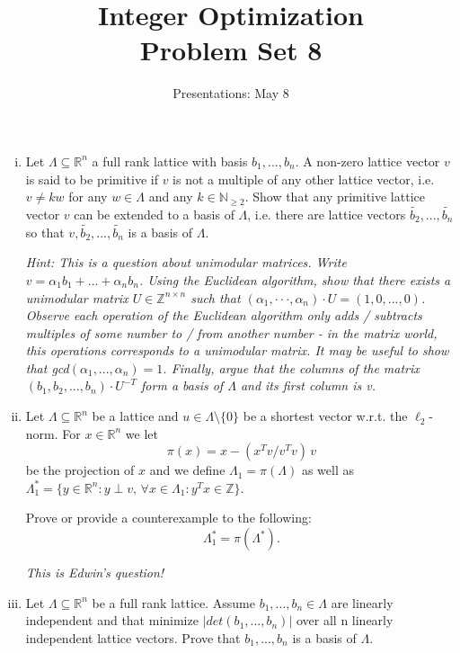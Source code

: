 \documentclass{article}
\title{Integer Optimization \\ Problem Set 8}
\date{Presentations: May 8}
\def\RR{\mathbb{R}}
\begin{document}
\maketitle


\begin{enumerate}[i)]
\item 
 Let $\Lambda \subseteq \mathbb{R}^n$ a full rank lattice with basis $b_1, ... , b_n$. A non-zero lattice vector $v$ is said to be primitive if $v$ is not 
 a multiple of any other lattice vector, i.e. $v \neq kw$ for any $w \in \Lambda$ and any $k \in \mathbb{N}_{\geq 2}$. Show that any primitive lattice 
 vector $v$ can be extended to a basis of $\Lambda$, i.e. there are lattice vectors 
 $\tilde{b_2}, ... , \tilde{b_n}$ so that $v, \tilde{b_2}, ... , \tilde{b_n}$ is a basis of $\Lambda$.

 
\emph{Hint: This is a question about unimodular matrices. Write $v = \alpha_1 b_1 + ... + \alpha_n b_n$. Using the Euclidean algorithm, show that there 
exists a unimodular matrix $U \in \mathbb{Z}^{n\times n}$ such that $(\alpha_1, · · · , \alpha_n) \cdot U = (1, 0, ... , 0)$. Observe each operation of the 
Euclidean algorithm only adds / subtracts multiples of some number to / from another number - in the matrix world, this operations corresponds to a 
unimodular matrix. It may be useful to show that gcd$(\alpha_1, ... , \alpha_n) = 1$. Finally, argue that the columns of the matrix $(b_1, b_2, ... , b_n)\cdot U^{-T}$ 
form a basis of $\Lambda$ and its first column is v.}


\item Let $Λ ⊆\mathbb{R}^n$ be a lattice and $u ∈ Λ \setminus \{0\}$ be a shortest vector w.r.t. the $\ell_2$-norm. For $x \in \mathbb{R}^n$ we let
  \begin{displaymath}
    π(x) = x - (x^Tv / v^Tv )\, v
  \end{displaymath}
  be the projection of $x$ and we define $Λ_1 = π(Λ)$ as well as $Λ_1^* = \{ y \in \mathbb{R}^n \colon y \perp v, \, \forall x ∈ Λ_1 \colon y^T x \in \mathbb{Z}\}$.

  Prove or provide a counterexample to the following:
  \begin{displaymath}
    Λ_1^* = π(Λ^*).  
  \end{displaymath}

  \hfill \emph{This is Edwin's question!}


\item 
Let $\Lambda \subseteq \RR^n$ be a full rank lattice. Assume $b_1,... ,b_n \in \Lambda$ are linearly independent and that minimize
$|det(b_1,... ,b_n)|$ over all n linearly independent lattice vectors. Prove that $b_1,... ,b_n$ is a basis of $\Lambda$.


\end{enumerate}
\end{document}

